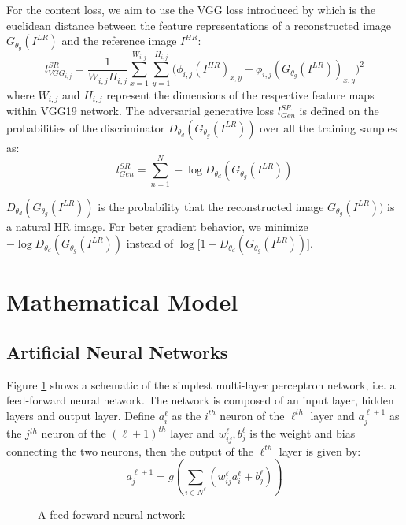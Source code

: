 \documentclass[oneside,a4paper,12pt]{report}
\begin{document}
	For the content loss, we aim to use the VGG loss introduced by \citet{ledig2017photorealistic} which is the euclidean distance between the feature representations of a reconstructed image $G_{\theta_g}(I^{LR})$ and the reference image $I^{HR}$:
	$$
		l^{SR}_{VGG_{i,j}} = \frac{1}{W_{i,j}H_{i,j}} \sum_{x=1}^{W_{i,j}}\sum_{y=1}^{H_{i,j}}\big(\phi_{i,j}(I^{HR})_{x,y}-\phi_{i,j}(G_{\theta_g}(I^{LR}))_{x,y}\big)^2
	$$
	where $W_{i,j}$ and $H_{i,j}$ represent the dimensions of the respective feature maps within VGG19 network. The adversarial generative loss $l^{SR}_{Gen}$ is defined on the probabilities of the discriminator $D_{\theta_d}(G_{\theta_g}(I^{LR}))$ over all the training samples as:
	$$
		l^{SR}_{Gen} = \sum_{n=1}^{N} - \log D_{\theta_d}(G_{\theta_g}(I^{LR}))
	$$

	$D_{\theta_d}(G_{\theta_g}(I^{LR}))$ is the probability that the reconstructed image $G_{\theta_g}(I^{LR}))$ is a natural HR image. For beter gradient behavior, we minimize $-\log D_{\theta_d}(G_{\theta_g}(I^{LR}))$ instead of $\log \big[1-D_{\theta_d}(G_{\theta_g}(I^{LR}))\big]$.
	
\pagebreak
	
\section{Mathematical Model}

\subsection{Artificial Neural Networks}
\hspace{0.25 in}Figure \ref{fig: ANN} shows a schematic of the simplest multi-layer perceptron network, i.e. a feed-forward neural network. The network is composed of an input layer, hidden layers and output layer. Define $a_i^\ell$ as the $i^{th}$ neuron of the $\ell^{th}$ layer and $a_j^{\ell+1}$ as the $j^{th}$ neuron of the $(\ell+1)^{th}$ layer and $w_{ij}^\ell, b_j^\ell$ is the weight and bias connecting the two neurons, then the output of the $\ell^{th}$ layer is given by:
\begin{equation}
    a^{\ell+1}_j = g(\sum_{i \in N^\ell}(w_{ij}^{\ell}a_i^{\ell} + b_j^{\ell}))
    \label{ANN_activation}
\end{equation}

\begin{figure}[!htb]
    \centering
    
    \caption{A feed forward neural network}
    \label{fig: ANN}
\end{figure}
\end{document}
